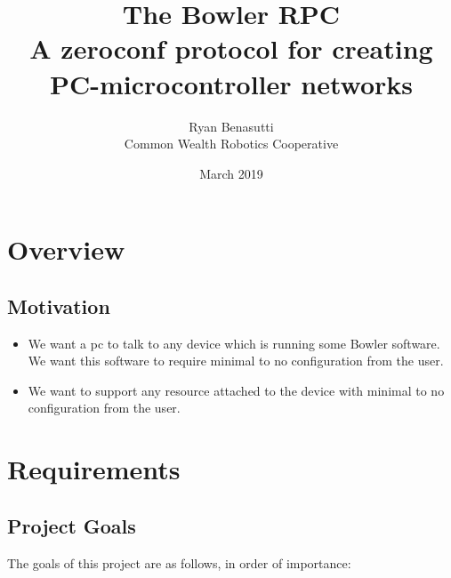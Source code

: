\documentclass{article}
\title{
    The Bowler RPC \\
    \large A zeroconf protocol for creating PC-microcontroller networks
}
\author{Ryan Benasutti \\ Common Wealth Robotics Cooperative}
\date{March 2019}
\begin{document}
\maketitle

\section{Overview}
\subsection{Motivation}

\begin{itemize}
    \item We want a \gls{pc} to talk to any \gls{device} which is running some Bowler software. We
    want this software to require minimal to no configuration from the user.
    
    \item We want to support any \gls{resource} attached to the \gls{device} with minimal to no
    configuration from the user.
\end{itemize}

\clearpage
\tableofcontents

\clearpage
\section{Requirements}

\subsection{Project Goals}

The goals of this project are as follows, in order of importance:
\end{document}
